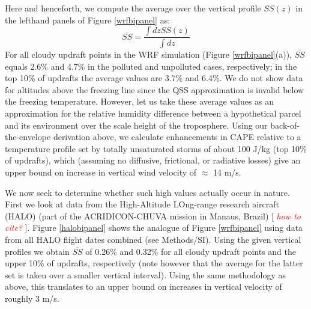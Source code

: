 \documentclass{article}
\newcommand{\klcomm}[1]{\textcolor{red}{\textit{#1}}}
\begin{document}
\clearpage
\newpage

Here and henceforth, we compute the average over the vertical profile $SS(z)$ in the lefthand panels of Figure \ref{wrfbipanel} as:
\begin{equation}
\label{avgss}
\overline{SS} = \frac{\int dz SS(z)}{\int dz}
\end{equation}
For all cloudy updraft points in the WRF simulation (Figure \ref{wrfbipanel}(a)), $\overline{SS}$ equals 2.6\% and 4.7\% in the polluted and unpolluted cases, respectively; in the top 10\% of updrafts the average values are 3.7\% and 6.4\%. We do not show data for altitudes above the freezing line since the QSS approximation is invalid below the freezing temperature. However, let us take these average values as an approximation for the relative humidity difference between a hypothetical parcel and its environment over the scale height of the troposphere. Using our back-of-the-envelope derivation above, we calculate enhancements in CAPE relative to a temperature profile set by totally unsaturated storms of about 100 J/kg (top 10\% of updrafts), which (assuming no diffusive, frictional, or radiative losses) give an upper bound on increase in vertical wind velocity of $\approx$ 14 m/s.

We now seek to determine whether such high values actually occur in nature. First we look at data from the High-Altitude LOng-range research aircraft (HALO) (part of the ACRIDICON-CHUVA mission in Manaus, Brazil) [ \klcomm{how to cite?} ]. Figure \ref{halobipanel} shows the analogue of Figure \ref{wrfbipanel} using data from all HALO flight dates combined (see Methods/SI). Using the given vertical profiles we obtain $\overline{SS}$ of 0.26\% and 0.32\% for all cloudy updraft points and the upper 10\% of updrafts, respectively (note however that the average for the latter set is taken over a smaller vertical interval). Using the same methodology as above, this translates to an upper bound on increases in vertical velocity of roughly 3 m/s. 

\clearpage
\newpage

\end{document}
